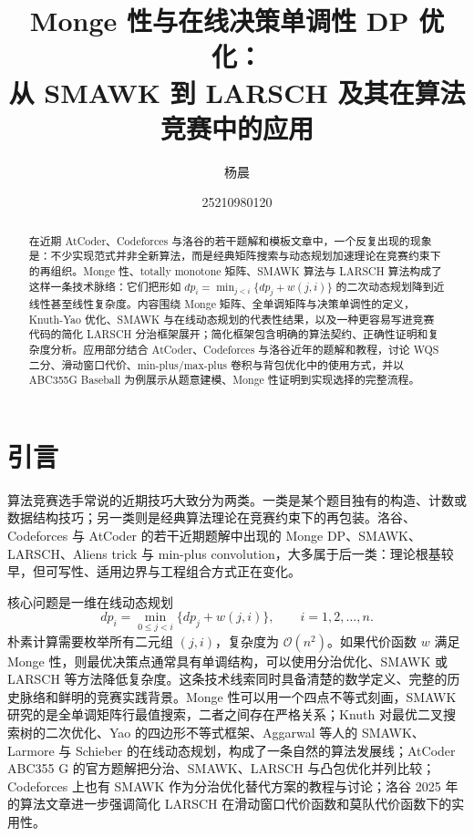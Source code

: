 \documentclass[lang=cn,a4paper,newtx,code=minted,bibtex]{elegantpaper}
\title{Monge 性与在线决策单调性 DP 优化：\\从 SMAWK 到 LARSCH 及其在算法竞赛中的应用}
\author{杨晨 \and 25210980120}
\institute{算法课程期末综述论文}
\date{\zhdate{2026/06/20}}
\newcommand{\BigO}{\mathcal{O}}
\begin{document}
\maketitle

\begin{abstract}
在近期 AtCoder、Codeforces 与洛谷的若干题解和模板文章中，一个反复出现的现象是：不少实现范式并非全新算法，而是经典矩阵搜索与动态规划加速理论在竞赛约束下的再组织。Monge 性、totally monotone 矩阵、SMAWK 算法与 LARSCH 算法构成了这样一条技术脉络：它们把形如 $dp_i=\min_{j<i}\{dp_j+w(j,i)\}$ 的二次动态规划降到近线性甚至线性复杂度。内容围绕 Monge 矩阵、全单调矩阵与决策单调性的定义，Knuth-Yao 优化、SMAWK 与在线动态规划的代表性结果，以及一种更容易写进竞赛代码的简化 LARSCH 分治框架展开；简化框架包含明确的算法契约、正确性证明和复杂度分析。应用部分结合 AtCoder、Codeforces 与洛谷近年的题解和教程，讨论 WQS 二分、滑动窗口代价、min-plus/max-plus 卷积与背包优化中的使用方式，并以 ABC355G Baseball 为例展示从题意建模、Monge 性证明到实现选择的完整流程。
\end{abstract}


\section{引言}

算法竞赛选手常说的近期技巧大致分为两类。一类是某个题目独有的构造、计数或数据结构技巧；另一类则是经典算法理论在竞赛约束下的再包装。洛谷、Codeforces 与 AtCoder 的若干近期题解中出现的 Monge DP、SMAWK、LARSCH、Aliens trick 与 min-plus convolution，大多属于后一类：理论根基较早，但可写性、适用边界与工程组合方式正在变化。

核心问题是一维在线动态规划
\begin{equation}
  dp_i=\min_{0\le j<i}\{dp_j+w(j,i)\},\qquad i=1,2,\ldots,n .
  \label{eq:basic-dp}
\end{equation}
朴素计算需要枚举所有二元组 $(j,i)$，复杂度为 $\BigO(n^2)$。如果代价函数 $w$ 满足 Monge 性，则最优决策点通常具有单调结构，可以使用分治优化、SMAWK 或 LARSCH 等方法降低复杂度。这条技术线索同时具备清楚的数学定义、完整的历史脉络和鲜明的竞赛实践背景。Monge 性可以用一个四点不等式刻画，SMAWK 研究的是全单调矩阵行最值搜索，二者之间存在严格关系；Knuth 对最优二叉搜索树的二次优化、Yao 的四边形不等式框架、Aggarwal 等人的 SMAWK、Larmore 与 Schieber 的在线动态规划，构成了一条自然的算法发展线；AtCoder ABC355 G 的官方题解把分治、SMAWK、LARSCH 与凸包优化并列比较\cite{atcoder2024abc355g}；Codeforces 上也有 SMAWK 作为分治优化替代方案的教程与讨论\cite{codeforces2023smawk}；洛谷 2025 年的算法文章进一步强调简化 LARSCH 在滑动窗口代价函数和莫队代价函数下的实用性\cite{luogu2025larsch}。
\end{document}
